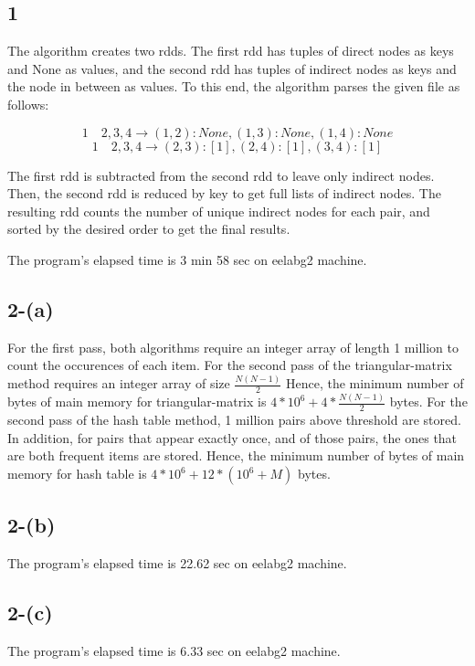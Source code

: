 \documentclass{article}
\begin{document}
\subsection*{1}

The algorithm creates two rdds. 
The first rdd has tuples of direct nodes as keys and None as values, 
and the second rdd has tuples of indirect nodes as keys and the node in between as values.
To this end, the algorithm parses the given file as follows:

\[
1 \quad 2,3,4 \rightarrow (1, 2): None, (1, 3): None, (1, 4): None
\]
\[
1 \quad 2,3,4 \rightarrow (2, 3): [1], (2, 4): [1], (3, 4): [1]
\]

\noindent
The first rdd is subtracted from the second rdd to leave only indirect nodes.
Then, the second rdd is reduced by key to get full lists of indirect nodes.
The resulting rdd counts the number of unique indirect nodes for each pair, 
and sorted by the desired order to get the final results.\newline

\noindent
The program's elapsed time is 3 min 58 sec on eelabg2 machine.

\subsection*{2-(a)}
For the first pass, both algorithms require an integer array of length 1 million 
to count the occurences of each item.
For the second pass of the triangular-matrix method requires an integer array of size
\(\frac{N(N-1)}{2}\)
Hence, the minimum number of bytes of main memory for triangular-matrix is \(4*10^6 + 4*\frac{N(N-1)}{2}\) bytes.
For the second pass of the hash table method, 1 million pairs above threshold are stored.
In addition, for pairs that appear exactly once, and of those pairs, the ones that are both frequent items are stored.
Hence, the minimum number of bytes of main memory for hash table is \(4*10^6 + 12*(10^6 + M)\) bytes.

\subsection*{2-(b)}
The program's elapsed time is 22.62 sec on eelabg2 machine.

\subsection*{2-(c)}
The program's elapsed time is 6.33 sec on eelabg2 machine.
\end{document}
